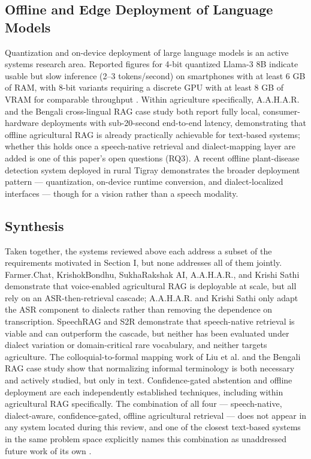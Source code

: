 \documentclass[conference]{IEEEtran}
\begin{document}
\subsection{Offline and Edge Deployment of Language Models}

Quantization and on-device deployment of large language models is an active systems research area. Reported figures for 4-bit quantized Llama-3 8B indicate usable but slow inference (2–3 tokens/second) on smartphones with at least 6 GB of RAM, with 8-bit variants requiring a discrete GPU with at least 8 GB of VRAM for comparable throughput \cite{compactllm2026}. Within agriculture specifically, A.A.H.A.R. \cite{dubey2025aahar} and the Bengali cross-lingual RAG case study \cite{hossain2026bengalirag} both report fully local, consumer-hardware deployments with sub-20-second end-to-end latency, demonstrating that offline agricultural RAG is already practically achievable for text-based systems; whether this holds once a speech-native retrieval and dialect-mapping layer are added is one of this paper's open questions (RQ3). A recent offline plant-disease detection system deployed in rural Tigray \cite{tigray2025plantdisease} demonstrates the broader deployment pattern — quantization, on-device runtime conversion, and dialect-localized interfaces — though for a vision rather than a speech modality.

\subsection{Synthesis}

Taken together, the systems reviewed above each address a subset of the requirements motivated in Section I, but none addresses all of them jointly. Farmer.Chat, KrishokBondhu, SukhaRakshak AI, A.A.H.A.R., and Krishi Sathi demonstrate that voice-enabled agricultural RAG is deployable at scale, but all rely on an ASR-then-retrieval cascade; A.A.H.A.R. and Krishi Sathi only adapt the ASR component to dialects rather than removing the dependence on transcription. SpeechRAG and S2R demonstrate that speech-native retrieval is viable and can outperform the cascade, but neither has been evaluated under dialect variation or domain-critical rare vocabulary, and neither targets agriculture. The colloquial-to-formal mapping work of Liu et al. and the Bengali RAG case study show that normalizing informal terminology is both necessary and actively studied, but only in text. Confidence-gated abstention and offline deployment are each independently established techniques, including within agricultural RAG specifically. The combination of all four — speech-native, dialect-aware, confidence-gated, offline agricultural retrieval — does not appear in any system located during this review, and one of the closest text-based systems in the same problem space explicitly names this combination as unaddressed future work of its own \cite{hossain2026bengalirag}.
\end{document}
